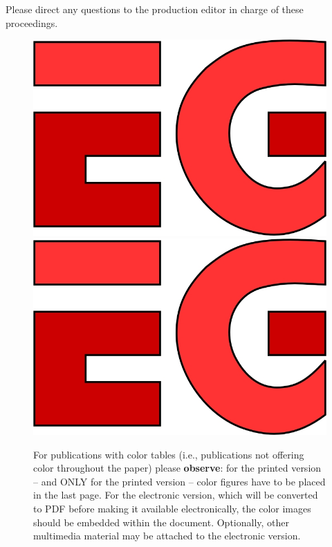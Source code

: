 Please direct any questions to the production editor in charge of
these proceedings.

 
       


\newpage


\begin{figure}[tbp]
  \centering
  \mbox{} \hfill
  \includegraphics[width=.3\linewidth]{sampleFig}
  \hfill
  \includegraphics[width=.3\linewidth]{sampleFig}
  \hfill \mbox{}
  \caption{\label{fig:ex3}%
           For publications with color tables (i.e., publications not offering
           color throughout the paper) please \textbf{observe}: 
           for the printed version -- and ONLY for the printed
           version -- color figures have to be placed in the last page.
           \newline
           For the electronic version, which will be converted to PDF before
           making it available electronically, the color images should be
           embedded within the document. Optionally, other multimedia
           material may be attached to the electronic version. }
\end{figure}


